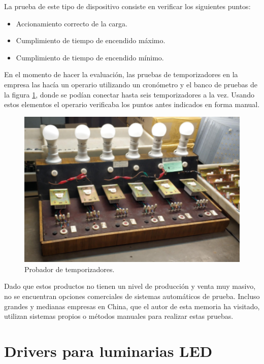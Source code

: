 La prueba de este tipo de dispositivo consiste en verificar los siguientes puntos:

\begin{itemize}
	\item Accionamiento correcto de la carga.
	\item Cumplimiento de tiempo de encendido máximo.
	\item Cumplimiento de tiempo de encendido mínimo.
\end{itemize}

En el momento de hacer la evaluación, las pruebas de temporizadores en la empresa las hacía un operario utilizando un cronómetro y el banco de pruebas de la figura \ref{fig:Probador}, donde se podían conectar hasta seis temporizadores a la vez. Usando estos elementos el operario verificaba los puntos antes indicados en forma manual.

\begin{figure}[ht]
	\centering
	\includegraphics[scale=.7]{./Figures/Probador.png}
	\caption{Probador de temporizadores.}
	\label{fig:Probador}
\end{figure}

Dado que estos productos no tienen un nivel de producción y venta muy masivo, no se encuentran opciones comerciales de sistemas automáticos de prueba. Incluso grandes y medianas empresas en China, que el autor de esta memoria ha visitado, utilizan sistemas propios o métodos manuales para realizar estas pruebas.


\section{Drivers para luminarias LED}

